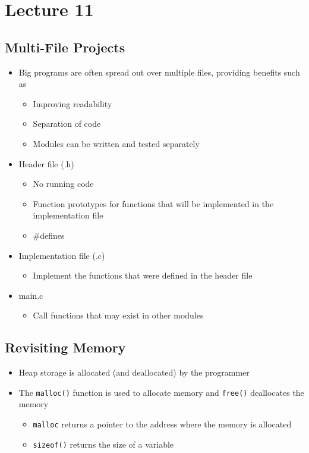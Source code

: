\documentclass{article}
\begin{document}
\newpage

\section{Lecture 11}

	\subsection{Multi-File Projects}
		
		\begin{itemize}
			\item Big programs are often spread out over multiple files, providing benefits such as
				\begin{itemize}
					\item Improving readability
					\item Separation of code
					\item Modules can be written and tested separately
				\end{itemize}
			\item Header file (.h)
				\begin{itemize}
					\item No running code
					\item Function prototypes for functions that will be implemented in the implementation file
					\item #defines
				\end{itemize}
			\item Implementation file (.c)
				\begin{itemize}
					\item Implement the functions that were defined in the header file
				\end{itemize}
			\item main.c
				\begin{itemize}
					\item Call functions that may exist in other modules
				\end{itemize}
		\end{itemize}

	\subsection{Revisiting Memory}
		
		\begin{itemize}
			\item Heap storage is allocated (and deallocated) by the programmer
			\item The \texttt{malloc()} function is used to allocate memory and \texttt{free()} deallocates the memory
				\begin{itemize}
					\item \texttt{malloc} returns a pointer to the address where the memory is allocated
					\item \texttt{sizeof()} returns the size of a variable
				\end{itemize}
		\end{itemize}
\end{document}
